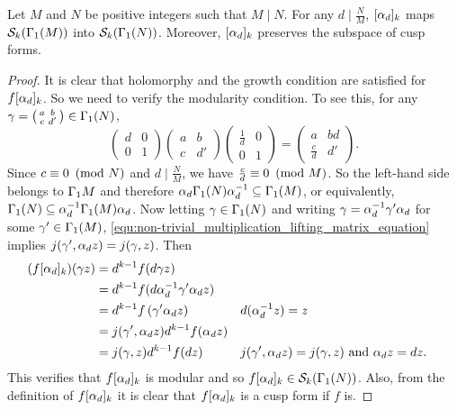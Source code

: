       \begin{proposition}
        Let $M$ and $N$ be positive integers such that $M \mid N$. For any $d \mid \frac{N}{M}$, $[\alpha_{d}]_{k}$ maps $\mathcal{S}_{k}(\Gamma_{1}(M))$ into $\mathcal{S}_{k}(\Gamma_{1}(N))$. Moreover, $[\alpha_{d}]_{k}$ preserves the subspace of cusp forms.
      \end{proposition}
      \begin{proof}
        It is clear that holomorphy and the growth condition are satisfied for $f[\alpha_{d}]_{k}$. So we need to verify the modularity condition. To see this, for any $\gamma = \begin{psmallmatrix} a & b \\ c & d' \end{psmallmatrix} \in \Gamma_{1}(N)$,
        \begin{equation}\label{equ:non-trivial_multiplication_lifting_matrix_equation}
          \begin{pmatrix} d & 0 \\ 0 & 1 \end{pmatrix}\begin{pmatrix} a & b \\ c & d' \end{pmatrix}\begin{pmatrix} \frac{1}{d} & 0 \\ 0 & 1 \end{pmatrix} = \begin{pmatrix} a & bd \\ \frac{c}{d} & d' \end{pmatrix}.
        \end{equation}
        Since $c \equiv 0 \ \left(\text{mod }N\right)$ and $d \mid \frac{N}{M}$, we have $\frac{c}{d} \equiv 0 \ \left(\text{mod }M\right)$. So the left-hand side belongs to $\Gamma_{1}M$ and therefore $\alpha_{d}\Gamma_{1}(N)\alpha_{d}^{-1} \subseteq \Gamma_{1}(M)$, or equivalently, $\Gamma_{1}(N) \subseteq \alpha_{d}^{-1}\Gamma_{1}(M)\alpha_{d}$. Now letting $\gamma \in \Gamma_{1}(N)$ and writing $\gamma = \alpha_{d}^{-1}\gamma'\alpha_{d}$ for some $\gamma' \in \Gamma_{1}(M)$, \cref{equ:non-trivial_multiplication_lifting_matrix_equation} implies $j(\gamma',\alpha_{d}z) = j(\gamma,z)$. Then 
        \begin{align*}
          (f[\alpha_{d}]_{k})(\gamma z) &= d^{k-1}f(d \gamma z) \\
          &= d^{k-1}f(d\alpha_{d}^{-1}\gamma'\alpha_{d}z) \\
          &= d^{k-1}f\left(\gamma'\alpha_{d}z\right) && \text{$d(\alpha_{d}^{-1}z) = z$}\\
          &= j(\gamma',\alpha_{d}z)d^{k-1}f(\alpha_{d}z) \\
          &= j(\gamma,z)d^{k-1}f(dz) && \text{$j(\gamma',\alpha_{d}z) = j(\gamma,z)$ and $\alpha_{d}z = dz$.}
        \end{align*}
        This verifies that $f[\alpha_{d}]_{k}$ is modular and so $f[\alpha_{d}]_{k} \in \mathcal{S}_{k}(\Gamma_{1}(N))$. Also, from the definition of $f[\alpha_{d}]_{k}$ it is clear that $f[\alpha_{d}]_{k}$ is a cusp form if $f$ is. 
      \end{proof}

